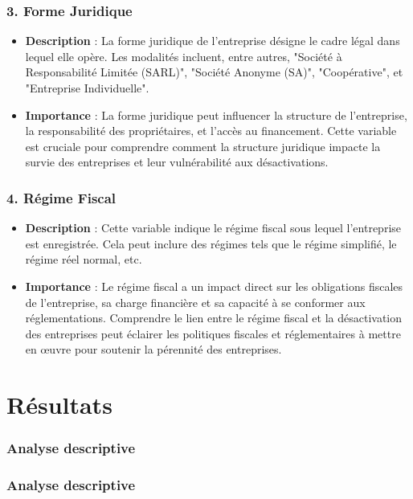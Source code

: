 \documentclass[a4paper,12pt]{report}
\begin{document}
\subsection{3. Forme Juridique}
\begin{itemize}
    \item \textbf{Description} : La forme juridique de l'entreprise désigne le cadre légal dans lequel elle opère. Les modalités incluent, entre autres, "Société à Responsabilité Limitée (SARL)", "Société Anonyme (SA)", "Coopérative", et "Entreprise Individuelle".
    \item \textbf{Importance} : La forme juridique peut influencer la structure de l'entreprise, la responsabilité des propriétaires, et l'accès au financement. Cette variable est cruciale pour comprendre comment la structure juridique impacte la survie des entreprises et leur vulnérabilité aux désactivations.
\end{itemize}

\subsection{4. Régime Fiscal}
\begin{itemize}
    \item \textbf{Description} : Cette variable indique le régime fiscal sous lequel l'entreprise est enregistrée. Cela peut inclure des régimes tels que le régime simplifié, le régime réel normal, etc.
    \item \textbf{Importance} : Le régime fiscal a un impact direct sur les obligations fiscales de l'entreprise, sa charge financière et sa capacité à se conformer aux réglementations. Comprendre le lien entre le régime fiscal et la désactivation des entreprises peut éclairer les politiques fiscales et réglementaires à mettre en œuvre pour soutenir la pérennité des entreprises.
\end{itemize}

\newpage
\chapter{Résultats}
\subsection{Analyse descriptive}

\subsection{Analyse descriptive}
\end{document}
